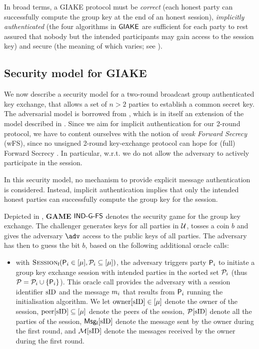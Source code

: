 	In broad terms, a GIAKE protocol must be \textit{correct} (each honest party can successfully compute the group key at the end of an honest session), \textit{implicitly authenticated} (the four algorithms in $\GIAKE$ are sufficient for each party to rest assured that nobody but the intended participants may gain access to the session key) and secure (the meaning of which varies; see ).

\subsection{Security model for GIAKE}\label{subsec:secmodel}
We now describe a security model for a two-round broadcast group authenticated key exchange, that allows a set of $n > 2$ parties to establish a common secret key.
The adversarial model is borrowed from \cite[Section 6.1]{PQR22}, which is in itself an extension of the model described in \cite{JKRS20}.
Since we aim for implicit authentication for our 2-round protocol, we have to content ourselves with the notion of \textit{weak Forward Secrecy} (wFS), since no unsigned 2-round key-exchange protocol can hope for (full) Forward Secrecy \cite[Section 3.2]{HMQV}.
In particular, w.r.t. \cite[Section 6.1]{PQR22} we do not allow the adversary to actively participate in the session.

In this security model, no mechanism to provide explicit message authentication is considered.
Instead, implicit authentication implies that only the intended honest parties can successfully compute the group key for the session.

Depicted in , {\textbf{GAME} $\GIAKEsecurityPFSGame$} denotes the security game for the group key exchange. 
The challenger generates keys for all parties in $\Universe$, tosses a coin $b$ and gives the adversary $\adv$ access to the public keys of all parties.
The adversary has then to guess the bit $b$, based on the following additional oracle calls:
\begin{itemize}
	\item with $\GakeIniO ( \GIni  \in [\mu], \PartySet_{i} \subseteq [\mu])$, the adversary triggers party $\User[i]$ to initiate a group key exchange session with intended parties in the sorted set $\PartySet_{i}$ (thus $\PartySet = \PartySet_{i}  \cup \{\User[i]\}$). This oracle call provides the adversary with a session identifier $\sID$ and the message $\GakeIniMes_{i}$ that results from $\User[i]$ running the initialisation algorithm. We let $\owner[\sID] \in [\mu]$ denote the owner of the session, $\peer[\sID] \subseteq[\mu]$ denote the peers of the session, $\GakeUSet[\sID]$ denote all the parties of the session, $\GIniMes[\sID]$ denote the message sent by the owner during the first round, and $\GIniMesSet[\sID]$ denote the messages received by the owner during the first round.
\end{itemize}


